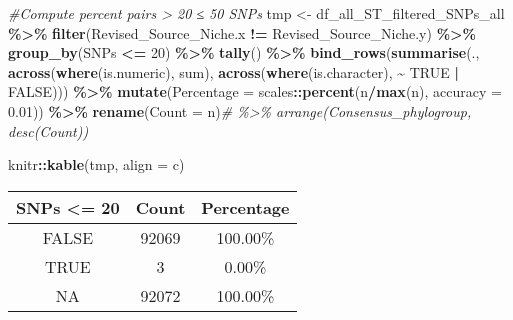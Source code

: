 \documentclass[
]{article}
\newenvironment{Shaded}{\begin{snugshade}}{\end{snugshade}}
\newcommand{\AttributeTok}[1]{\textcolor[rgb]{0.13,0.29,0.53}{#1}}
\newcommand{\CommentTok}[1]{\textcolor[rgb]{0.56,0.35,0.01}{\textit{#1}}}
\newcommand{\ConstantTok}[1]{\textcolor[rgb]{0.56,0.35,0.01}{#1}}
\newcommand{\DecValTok}[1]{\textcolor[rgb]{0.00,0.00,0.81}{#1}}
\newcommand{\FloatTok}[1]{\textcolor[rgb]{0.00,0.00,0.81}{#1}}
\newcommand{\FunctionTok}[1]{\textcolor[rgb]{0.13,0.29,0.53}{\textbf{#1}}}
\newcommand{\NormalTok}[1]{#1}
\newcommand{\OtherTok}[1]{\textcolor[rgb]{0.56,0.35,0.01}{#1}}
\newcommand{\SpecialCharTok}[1]{\textcolor[rgb]{0.81,0.36,0.00}{\textbf{#1}}}
\newcommand{\StringTok}[1]{\textcolor[rgb]{0.31,0.60,0.02}{#1}}
\begin{document}
\begin{Shaded}
\begin{Highlighting}[]
\CommentTok{\#Compute percent pairs \textgreater{} 20 ≤ 50 SNPs}
\NormalTok{tmp }\OtherTok{\textless{}{-}}\NormalTok{ df\_all\_ST\_filtered\_SNPs\_all }\SpecialCharTok{\%\textgreater{}\%} \FunctionTok{filter}\NormalTok{(Revised\_Source\_Niche.x }\SpecialCharTok{!=}\NormalTok{ Revised\_Source\_Niche.y) }\SpecialCharTok{\%\textgreater{}\%} \FunctionTok{group\_by}\NormalTok{(SNPs }\SpecialCharTok{\textless{}=} \DecValTok{20}\NormalTok{) }\SpecialCharTok{\%\textgreater{}\%} \FunctionTok{tally}\NormalTok{() }\SpecialCharTok{\%\textgreater{}\%} 
  \FunctionTok{bind\_rows}\NormalTok{(}\FunctionTok{summarise}\NormalTok{(.,}
                      \FunctionTok{across}\NormalTok{(}\FunctionTok{where}\NormalTok{(is.numeric), sum),}
                      \FunctionTok{across}\NormalTok{(}\FunctionTok{where}\NormalTok{(is.character), }\SpecialCharTok{\textasciitilde{}} \ConstantTok{TRUE} \SpecialCharTok{|} \ConstantTok{FALSE}\NormalTok{))) }\SpecialCharTok{\%\textgreater{}\%}
  \FunctionTok{mutate}\NormalTok{(}\AttributeTok{Percentage =}\NormalTok{ scales}\SpecialCharTok{::}\FunctionTok{percent}\NormalTok{(n}\SpecialCharTok{/}\FunctionTok{max}\NormalTok{(n), }\AttributeTok{accuracy =} \FloatTok{0.01}\NormalTok{)) }\SpecialCharTok{\%\textgreater{}\%}
  \FunctionTok{rename}\NormalTok{(}\StringTok{\textquotesingle{}Count\textquotesingle{}} \OtherTok{=}\NormalTok{ n)}\CommentTok{\# \%\textgreater{}\% arrange(Consensus\_phylogroup, desc(Count))}

\NormalTok{knitr}\SpecialCharTok{::}\FunctionTok{kable}\NormalTok{(tmp, }\AttributeTok{align =} \StringTok{\textquotesingle{}c\textquotesingle{}}\NormalTok{)}
\end{Highlighting}
\end{Shaded}

\begin{longtable}[]{@{}ccc@{}}
\toprule\noalign{}
SNPs \textless= 20 & Count & Percentage \\
\midrule\noalign{}
\endhead
\bottomrule\noalign{}
\endlastfoot
FALSE & 92069 & 100.00\% \\
TRUE & 3 & 0.00\% \\
NA & 92072 & 100.00\% \\
\end{longtable}
\end{document}
